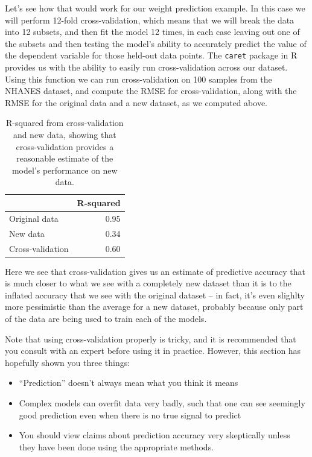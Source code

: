 \documentclass[12pt,]{book}
\providecommand{\tightlist}{%
  \setlength{\itemsep}{0pt}\setlength{\parskip}{0pt}}
\theoremstyle{definition}
\theoremstyle{definition}
\theoremstyle{definition}
\theoremstyle{remark}
\begin{document}
Let's see how that would work for our weight prediction example. In this case we will perform 12-fold cross-validation, which means that we will break the data into 12 subsets, and then fit the model 12 times, in each case leaving out one of the subsets and then testing the model's ability to accurately predict the value of the dependent variable for those held-out data points. The \texttt{caret} package in R provides us with the ability to easily run cross-validation across our dataset. Using this function we can run cross-validation on 100 samples from the NHANES dataset, and compute the RMSE for cross-validation, along with the RMSE for the original data and a new dataset, as we computed above.

\begin{table}

\caption{\label{tab:unnamed-chunk-109}R-squared from cross-validation and new data, showing that cross-validation provides a reasonable estimate of the model's performance on new data.}
\centering
\begin{tabular}[t]{l|r}
\hline
  & R-squared\\
\hline
Original data & 0.95\\
\hline
New data & 0.34\\
\hline
Cross-validation & 0.60\\
\hline
\end{tabular}
\end{table}

Here we see that cross-validation gives us an estimate of predictive accuracy that is much closer to what we see with a completely new dataset than it is to the inflated accuracy that we see with the original dataset -- in fact, it's even slighlty more pessimistic than the average for a new dataset, probably because only part of the data are being used to train each of the models.

Note that using cross-validation properly is tricky, and it is recommended that you consult with an expert before using it in practice. However, this section has hopefully shown you three things:

\begin{itemize}
\tightlist
\item
  ``Prediction'' doesn't always mean what you think it means
\item
  Complex models can overfit data very badly, such that one can see seemingly good prediction even when there is no true signal to predict
\item
  You should view claims about prediction accuracy very skeptically unless they have been done using the appropriate methods.
\end{itemize}
\end{document}
